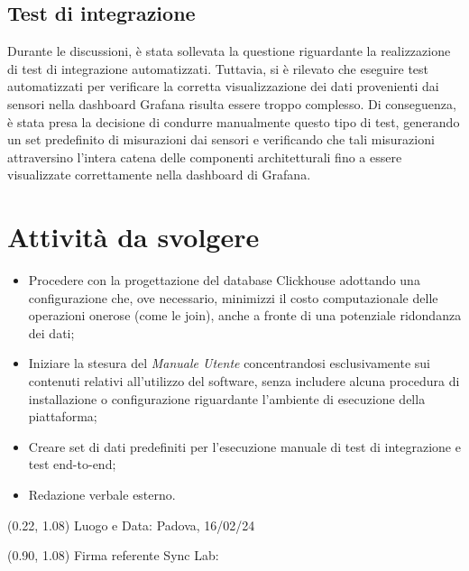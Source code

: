 \documentclass{article}
\begin{document}
    \subsection{Test di integrazione}
    Durante le discussioni, è stata sollevata la questione riguardante la realizzazione di test di integrazione automatizzati. Tuttavia, si è rilevato che eseguire test automatizzati per verificare la corretta visualizzazione dei dati provenienti dai sensori nella dashboard Grafana risulta essere troppo complesso. Di conseguenza, è stata presa la decisione di condurre manualmente questo tipo di test, generando un set predefinito di misurazioni dai sensori e verificando che tali misurazioni attraversino l'intera catena delle componenti architetturali fino a essere visualizzate correttamente nella dashboard di Grafana.

\section{Attività da svolgere}
    \begin{itemize}
        \item Procedere con la progettazione del database Clickhouse adottando una configurazione che, ove necessario, minimizzi il costo computazionale delle operazioni onerose (come le join), anche a fronte di una potenziale ridondanza dei dati;
        \item Iniziare la stesura del \textit{Manuale Utente} concentrandosi esclusivamente sui contenuti relativi all'utilizzo del software, senza includere alcuna procedura di installazione o configurazione riguardante l'ambiente di esecuzione della piattaforma;
        \item Creare set di dati predefiniti per l'esecuzione manuale di test di integrazione e test end-to-end;
        \item Redazione verbale esterno.
    \end{itemize}




\begin{textblock*}{\textwidth}(0.22\textwidth, 1.08\textheight)
    Luogo e Data: Padova, 16/02/24
\end{textblock*}

\begin{textblock*}{\textwidth}(0.90\textwidth, 1.08\textheight)
        Firma referente Sync Lab:
\end{textblock*}
\end{document}
